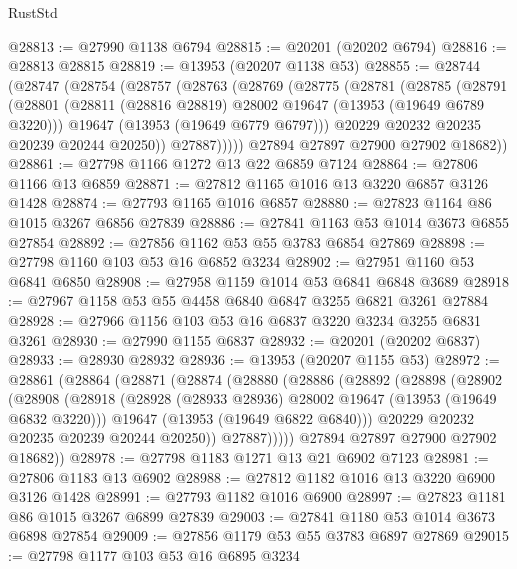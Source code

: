 \begin{lexlean}{RustStd}
\begin{coremodule}
@28813 := @27990 @1138 @6794
@28815 := @20201 (@20202 @6794)
@28816 := @28813 @28815
@28819 := @13953 (@20207 @1138 @53)
@28855 := @28744
    (@28747
      (@28754
        (@28757
          (@28763
            (@28769
              (@28775
                (@28781
                  (@28785
                    (@28791
                      (@28801
                        (@28811 (@28816 @28819) @28002 @19647 (@13953 (@19649 @6789 @3220)))
                        @19647
                        (@13953 (@19649 @6779 @6797)))
                      @20229
                      @20232
                      @20235
                      @20239
                      @20244
                      @20250))
                  @27887)))))
        @27894
        @27897
        @27900
        @27902
        @18682))
@28861 := @27798 @1166 @1272 @13 @22 @6859 @7124
@28864 := @27806 @1166 @13 @6859
@28871 := @27812 @1165 @1016 @13 @3220 @6857 @3126 @1428
@28874 := @27793 @1165 @1016 @6857
@28880 := @27823 @1164 @86 @1015 @3267 @6856 @27839
@28886 := @27841 @1163 @53 @1014 @3673 @6855 @27854
@28892 := @27856 @1162 @53 @55 @3783 @6854 @27869
@28898 := @27798 @1160 @103 @53 @16 @6852 @3234
@28902 := @27951 @1160 @53 @6841 @6850
@28908 := @27958 @1159 @1014 @53 @6841 @6848 @3689
@28918 := @27967 @1158 @53 @55 @4458 @6840 @6847 @3255 @6821 @3261 @27884
@28928 := @27966 @1156 @103 @53 @16 @6837 @3220 @3234 @3255 @6831 @3261
@28930 := @27990 @1155 @6837
@28932 := @20201 (@20202 @6837)
@28933 := @28930 @28932
@28936 := @13953 (@20207 @1155 @53)
@28972 := @28861
    (@28864
      (@28871
        (@28874
          (@28880
            (@28886
              (@28892
                (@28898
                  (@28902
                    (@28908
                      (@28918
                        (@28928 (@28933 @28936) @28002 @19647 (@13953 (@19649 @6832 @3220)))
                        @19647
                        (@13953 (@19649 @6822 @6840)))
                      @20229
                      @20232
                      @20235
                      @20239
                      @20244
                      @20250))
                  @27887)))))
        @27894
        @27897
        @27900
        @27902
        @18682))
@28978 := @27798 @1183 @1271 @13 @21 @6902 @7123
@28981 := @27806 @1183 @13 @6902
@28988 := @27812 @1182 @1016 @13 @3220 @6900 @3126 @1428
@28991 := @27793 @1182 @1016 @6900
@28997 := @27823 @1181 @86 @1015 @3267 @6899 @27839
@29003 := @27841 @1180 @53 @1014 @3673 @6898 @27854
@29009 := @27856 @1179 @53 @55 @3783 @6897 @27869
@29015 := @27798 @1177 @103 @53 @16 @6895 @3234

\end{coremodule}
\end{lexlean}
